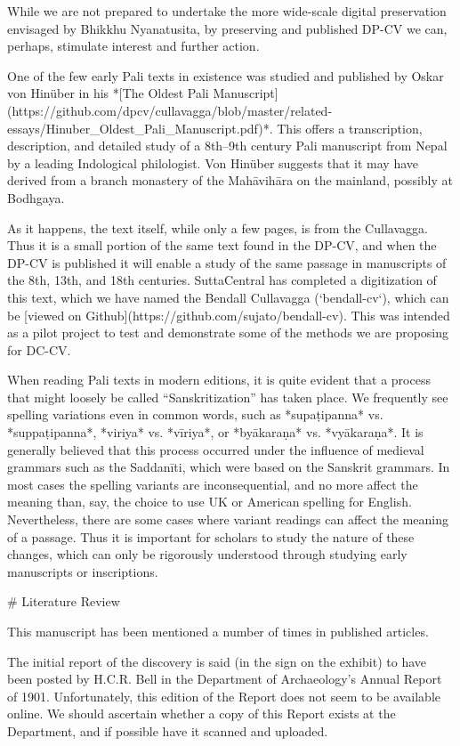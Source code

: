 \documentclass[11pt, openany,a5paper]{article}
\begin{document}
\begin{markdown}
While we are not prepared to undertake the more wide-scale digital preservation envisaged by Bhikkhu Nyanatusita, by preserving and published DP-CV we can, perhaps, stimulate interest and further action.

One of the few early Pali texts in existence was studied and published by Oskar von Hinüber in his *[The Oldest Pali Manuscript](https://github.com/dpcv/cullavagga/blob/master/related-essays/Hinuber_Oldest_Pali_Manuscript.pdf)*. This offers a transcription, description, and detailed study of a 8th–9th century Pali manuscript from Nepal by a leading Indological philologist. Von Hinüber suggests that it may have derived from a branch monastery of the Mahāvihāra on the mainland, possibly at Bodhgaya.

As it happens, the text itself, while only a few pages, is from the Cullavagga. Thus it is a small portion of the same text found in the DP-CV, and when the DP-CV is published it will enable a study of the  same passage in manuscripts of the 8th, 13th, and 18th centuries. SuttaCentral has completed a digitization of this text, which we have named the Bendall Cullavagga (`bendall-cv`), which can be [viewed on Github](https://github.com/sujato/bendall-cv). This was intended as a pilot project to test and demonstrate some of the methods we are proposing for DC-CV.

When reading Pali texts in modern editions, it is quite evident that a process that might loosely be called “Sanskritization” has taken place. We frequently see spelling variations even in common words, such as *supaṭipanna* vs. *suppaṭipanna*, *viriya* vs. *vīriya*, or *byākaraṇa* vs. *vyākaraṇa*. It is generally believed that this process occurred under the influence of medieval grammars such as the Saddanīti, which were based on the Sanskrit grammars. In most cases the spelling variants are inconsequential, and no more affect the meaning than, say, the choice to use UK or American spelling for English. Nevertheless, there are some cases where variant readings can affect the meaning of a passage. Thus it is important for scholars to study the nature of these changes, which can only be rigorously understood through studying early manuscripts or inscriptions.

# Literature Review

This manuscript has been mentioned a number of times in published articles.

The initial report of the discovery is said (in the sign on the exhibit) to have been posted by H.C.R. Bell in the Department of Archaeology’s Annual Report of 1901. Unfortunately, this edition of the Report does not seem to be available online. We should ascertain whether a copy of this Report exists at the Department, and if possible have it scanned and uploaded.


\end{markdown}
\end{document}
